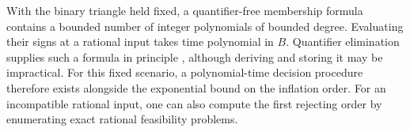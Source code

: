 With the binary triangle held fixed, a quantifier-free membership formula contains a bounded number of integer polynomials of bounded degree. Evaluating their signs at a rational input takes time polynomial in $B$. Quantifier elimination supplies such a formula in principle \cite{BasuPollackRoy2006}, although deriving and storing it may be impractical. For this fixed scenario, a polynomial-time decision procedure therefore exists alongside the exponential bound on the inflation order. For an incompatible rational input, one can also compute the first rejecting order by enumerating exact rational feasibility problems.
